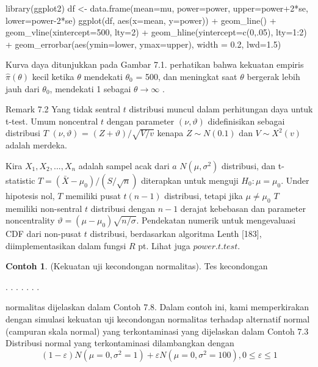 \documentclass[a4paper,12pt]{article}
\theoremstyle{definition}
\newtheorem{example}{Contoh}[section]
\begin{document}
\begin{spverbatim}
library(ggplot2)
df <- data.frame(mean=mu, power=power,
        upper=power+2*se, lower=power-2*se)
ggplot(df, aes(x=mean, y=power)) +
    geom_line() +
    geom_vline(xintercept=500, lty=2) +
    geom_hline(yintercept=c(0,.05), lty=1:2) +
    geom_errorbar(aes(ymin=lower, ymax=upper), width = 0.2, lwd=1.5)
\end{spverbatim}

Kurva daya ditunjukkan pada Gambar 7.1. perhatikan bahwa kekuatan empiris $\hat{\pi}(\theta)$ kecil ketika $\theta$ mendekati $\theta_{0}$ = 500, dan meningkat saat $\theta$ bergerak lebih jauh dari $\theta_{0}$, mendekati 1 sebagai $\theta\rightarrow\infty$ .

Remark 7.2 Yang tidak sentral $t$ distribusi muncul dalam perhitungan daya untuk t-test.  Umum noncentral $t$ dengan parameter $(\nu,\vartheta)$ didefinisikan sebagai distribusi $T$ $(\nu,\vartheta)$ = $(Z + \vartheta)/\sqrt{V/v}$ kenapa $Z\sim N(0.1)$ dan $V\sim X^{2}(v)$ adalah
merdeka.

Kira $X_{1},X_{2},...,X_{n}$ adalah sampel acak dari $a$ $N (\mu , \sigma ^{2})$ distribusi, dan t-statistic $T = \left ( \bar{X} - \mu_{0}\right ) / \left ( S/\sqrt{n} \right )$ diterapkan untuk menguji $H_{0} : \mu = \mu_{0}$. Under hipotesis nol, $T$ memiliki pusat $t(n-1)$ distribusi,  tetapi jika $\mu \neq \mu_{0}$ $T$ memiliki non-sentral $t$ distribusi dengan $n-1$ derajat kebebasan dan parameter noncentrality $\vartheta = (\mu -\mu _{0})\sqrt{n/\sigma}.$ Pendekatan numerik untuk mengevaluasi CDF dari non-pusat $t$ distribusi, berdasarkan algoritma Lenth [183], diimplementasikan dalam fungsi $R$ pt. Lihat juga $power.t.test.$ 

\begin{example}
    (Kekuatan uji kecondongan normalitas). Tes kecondongan
\end{example}

.
.
.
.
.
.
.

normalitas dijelaskan dalam Contoh 7.8. Dalam contoh ini, kami memperkirakan dengan simulasi kekuatan uji kecondongan normalitas terhadap alternatif normal (campuran skala normal) yang terkontaminasi yang dijelaskan dalam Contoh 7.3 Distribusi normal yang terkontaminasi dilambangkan dengan 
\begin{equation}
    \left ( 1-\varepsilon  \right )N\left ( \mu =0,\sigma ^{2}=1 \right ) + \varepsilon N\left ( \mu =0,\sigma ^{2}=100 \right ), 0\leq \varepsilon \leq 1
\end{equation}
\end{document}
